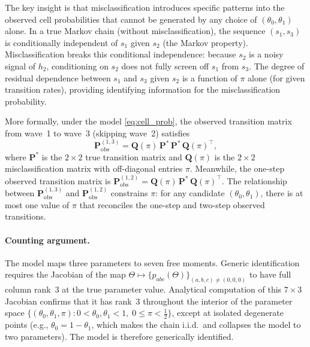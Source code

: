 \documentclass[12pt]{article}
\begin{document}
The key insight is that misclassification introduces specific patterns
into the observed cell probabilities that cannot be generated by any
choice of \((\theta_0, \theta_1)\) alone. In a true Markov chain
(without misclassification), the sequence \((s_1, s_3)\) is
conditionally independent of \(s_1\) given \(s_2\) (the Markov
property). Misclassification breaks this conditional independence:
because \(s_2\) is a noisy signal of \(h_2\), conditioning on \(s_2\)
does not fully screen off \(s_1\) from \(s_3\). The degree of residual
dependence between \(s_1\) and \(s_3\) given \(s_2\) is a function of
\(\pi\) alone (for given transition rates), providing identifying
information for the misclassification probability.

More formally, under the model \eqref{eq:cell_prob}, the observed
transition matrix from wave~1 to wave~3 (skipping wave~2) satisfies
\begin{equation}
\mathbf{P}^{(1,3)}_{\text{obs}} =
\mathbf{Q}(\pi)\,\mathbf{P}^*\,\mathbf{P}^*\,\mathbf{Q}(\pi)^\top,
\label{eq:two_step}
\end{equation}
where \(\mathbf{P}^*\) is the \(2 \times 2\) true transition matrix and
\(\mathbf{Q}(\pi)\) is the \(2 \times 2\) misclassification matrix with
off-diagonal entries \(\pi\). Meanwhile, the one-step observed
transition matrix is
\(\mathbf{P}^{(1,2)}_{\text{obs}} = \mathbf{Q}(\pi)\, \mathbf{P}^*\,
\mathbf{Q}(\pi)^\top\). The relationship between
\(\mathbf{P}^{(1,3)}_{\text{obs}}\) and
\(\mathbf{P}^{(1,2)}_{\text{obs}}\) constrains \(\pi\): for any
candidate \((\theta_0, \theta_1)\), there is at most one value of
\(\pi\) that reconciles the one-step and two-step observed transitions.

\paragraph{Counting argument.}
The model maps three parameters to seven free moments. Generic
identification requires the Jacobian of the map
\(\Theta \mapsto \{p_{abc}(\Theta)\}_{(a,b,c) \neq (0,0,0)}\) to have
full column rank~3 at the true parameter value. Analytical computation
of this \(7 \times 3\) Jacobian confirms that it has rank~3 throughout
the interior of the parameter space
\(\{(\theta_0, \theta_1, \pi) : 0 < \theta_0, \theta_1 < 1,\;
0 \leq \pi < \tfrac{1}{2}\}\), except at isolated degenerate points
(e.g., \(\theta_0 = 1 - \theta_1\), which makes the chain i.i.d.\ and
collapses the model to two parameters). The model is therefore
generically identified.
\end{document}

